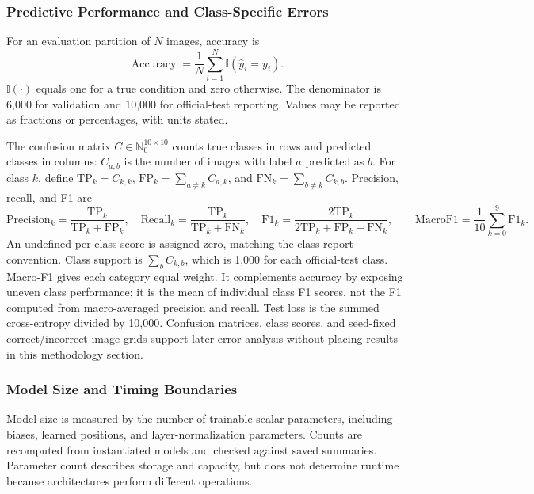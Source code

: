 \subsubsection{Predictive Performance and Class-Specific Errors}
For an evaluation partition of $N$ images, accuracy is
\begin{equation}
 \operatorname{Accuracy}=\frac{1}{N}\sum_{i=1}^{N}
       \mathbb{I}(\hat y_i=y_i).
 \label{eq:meth_accuracy}
\end{equation}
$\mathbb{I}(\cdot)$ equals one for a true condition and zero otherwise.
The denominator is 6,000 for validation and 10,000 for official-test reporting.
Values may be reported as fractions or percentages, with units stated.

The confusion matrix $C\in\mathbb{N}_0^{10\times10}$ counts true classes
in rows and predicted classes in columns: $C_{a,b}$ is the number of images
with label $a$ predicted as $b$. For class $k$, define
$\mathrm{TP}_k=C_{k,k}$,
$\mathrm{FP}_k=\sum_{a\ne k}C_{a,k}$, and
$\mathrm{FN}_k=\sum_{b\ne k}C_{k,b}$. Precision, recall, and F1 are
\begin{equation}
 \mathrm{Precision}_k=\frac{\mathrm{TP}_k}{\mathrm{TP}_k+\mathrm{FP}_k},\quad
 \mathrm{Recall}_k=\frac{\mathrm{TP}_k}{\mathrm{TP}_k+\mathrm{FN}_k},\quad
 \mathrm{F1}_k=\frac{2\mathrm{TP}_k}
 {2\mathrm{TP}_k+\mathrm{FP}_k+\mathrm{FN}_k},\qquad
 \mathrm{MacroF1}=\frac{1}{10}\sum_{k=0}^{9}\mathrm{F1}_k.
 \label{eq:meth_f1}
\end{equation}
An undefined per-class score is assigned zero, matching the class-report
convention. Class support is $\sum_bC_{k,b}$, which is 1,000 for each
official-test class. Macro-F1 gives each category equal weight. It complements
accuracy by exposing uneven class performance; it is the mean of individual
class F1 scores, not the F1 computed from macro-averaged precision and recall.
Test loss is the summed cross-entropy divided by 10,000. Confusion matrices,
class scores, and seed-fixed correct/incorrect image grids support later
error analysis without placing results in this methodology section.

\subsubsection{Model Size and Timing Boundaries}
Model size is measured by the number of trainable scalar parameters, including
biases, learned positions, and layer-normalization parameters. Counts are
recomputed from instantiated models and checked against saved summaries.
Parameter count describes storage and capacity, but does not determine runtime
because architectures perform different operations.

